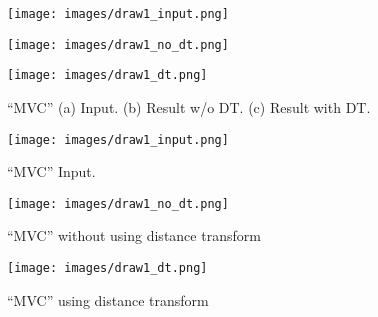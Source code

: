 \begin{figure}[ht]
\centering
 \begin{minipage}[h]{.35\textheight}
  \centering
  \texttt{[image: images/draw1\_input.png]}
  \vspace{.1cm}
  \end{minipage}
 \begin{minipage}[h]{.35\textheight}
  \centering
  \texttt{[image: images/draw1\_no\_dt.png]}
  \vspace{.1cm}
  \end{minipage}
 \begin{minipage}[h]{.35\textheight}
  \centering
  \texttt{[image: images/draw1\_dt.png]}
  \end{minipage}
  \caption[``MVC'']{
  ``MVC'' (a) Input. (b) Result w/o DT. (c) Result with DT.
  }\label{fig:mvc}
\end{figure}

\fi

\begin{figure}[t]
\centering
  \texttt{[image: images/draw1\_input.png]}
  \caption[``MVC'' Input]{
  ``MVC'' Input.
  }\label{fig:mvcInput}
\end{figure}

\begin{figure}[t]
\centering
  \texttt{[image: images/draw1\_no\_dt.png]}
  \caption[``MVC'' w/o DT]{
  ``MVC'' without using distance transform
  }\label{fig:mvcNoDT}
\end{figure}

\begin{figure}[b]
\centering
  \texttt{[image: images/draw1\_dt.png]}
  \caption[``MVC'' with DT]{
  ``MVC'' using distance transform
  }\label{fig:mvcDT}
\end{figure}

\clearpage

